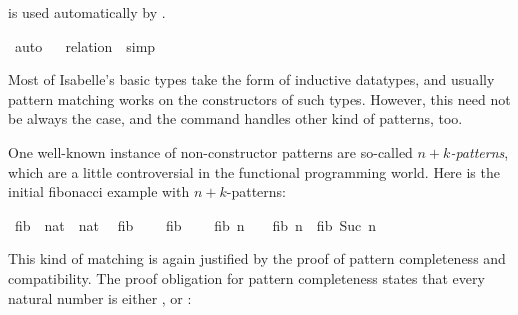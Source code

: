 \begin{isabellebody}
\begin{isamarkuptxt}
  is used automatically by .%
\end{isamarkuptxt}%
\isamarkuptrue%
\isamarkupfalse%
\ auto%
\endisatagproof
{\isafoldproof}%
%
\isadelimproof
%
\endisadelimproof
\isanewline
{}\isamarkupfalse%
%
\isadelimproof
\ %
\endisadelimproof
%
\isatagproof
{}\isamarkupfalse%
\ {}relation\ {}{}{}{}{}\ simp%
\endisatagproof
{\isafoldproof}%
%
\isadelimproof
%
\endisadelimproof
%
\isamarkuptrue%
%
\begin{isamarkuptext}%
Most of Isabelle's basic types take the form of inductive datatypes,
  and usually pattern matching works on the constructors of such types. 
  However, this need not be always the case, and the 
  command handles other kind of patterns, too.

  One well-known instance of non-constructor patterns are
  so-called \emph{$n+k$-patterns}, which are a little controversial in
  the functional programming world. Here is the initial fibonacci
  example with $n+k$-patterns:%
\end{isamarkuptext}%
\isamarkuptrue%
\isamarkupfalse%
\ fib{}\ {}{}\ {}nat\ {}\ nat{}\isanewline
{}\isanewline
\ \ {}fib{}\ {}\ {}\ {}{}\isanewline
{}\ {}fib{}\ {}\ {}\ {}{}\isanewline
{}\ {}fib{}\ {}n\ {}\ {}{}\ {}\ fib{}\ n\ {}\ fib{}\ {}Suc\ n{}{}%
\isadelimproof
%
\endisadelimproof
%
\isatagproof
%
\begin{isamarkuptxt}%
This kind of matching is again justified by the proof of pattern
  completeness and compatibility. 
  The proof obligation for pattern completeness states that every natural number is
  either ,  or :


\end{isamarkuptxt}
\end{isabellebody}
